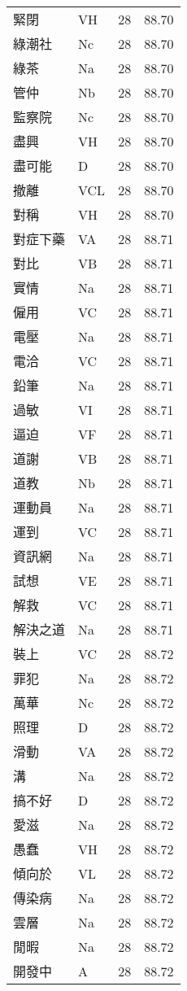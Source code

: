\documentclass[twocolumn]{book}
\begin{document}
\begin{supertabular}{llrr}
緊閉 & VH & 28 &  88.70\\
綠潮社 & Nc & 28 &  88.70\\
綠茶 & Na & 28 &  88.70\\
管仲 & Nb & 28 &  88.70\\
監察院 & Nc & 28 &  88.70\\
盡興 & VH & 28 &  88.70\\
盡可能 & D & 28 &  88.70\\
撤離 & VCL & 28 &  88.70\\
對稱 & VH & 28 &  88.70\\
對症下藥 & VA & 28 &  88.71\\
對比 & VB & 28 &  88.71\\
實情 & Na & 28 &  88.71\\
僱用 & VC & 28 &  88.71\\
電壓 & Na & 28 &  88.71\\
電洽 & VC & 28 &  88.71\\
鉛筆 & Na & 28 &  88.71\\
過敏 & VI & 28 &  88.71\\
逼迫 & VF & 28 &  88.71\\
道謝 & VB & 28 &  88.71\\
道教 & Nb & 28 &  88.71\\
運動員 & Na & 28 &  88.71\\
運到 & VC & 28 &  88.71\\
資訊網 & Na & 28 &  88.71\\
試想 & VE & 28 &  88.71\\
解救 & VC & 28 &  88.71\\
解決之道 & Na & 28 &  88.71\\
裝上 & VC & 28 &  88.72\\
罪犯 & Na & 28 &  88.72\\
萬華 & Nc & 28 &  88.72\\
照理 & D & 28 &  88.72\\
滑動 & VA & 28 &  88.72\\
溝 & Na & 28 &  88.72\\
搞不好 & D & 28 &  88.72\\
愛滋 & Na & 28 &  88.72\\
愚蠢 & VH & 28 &  88.72\\
傾向於 & VL & 28 &  88.72\\
傳染病 & Na & 28 &  88.72\\
雲層 & Na & 28 &  88.72\\
閒暇 & Na & 28 &  88.72\\
開發中 & A & 28 &  88.72\\

\end{supertabular}
\end{document}
